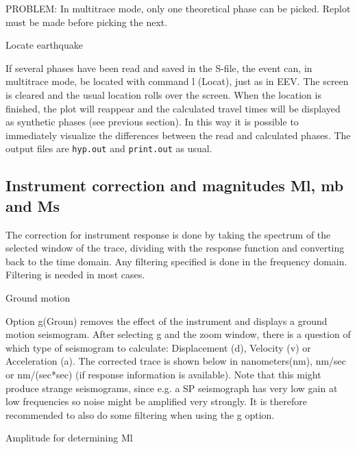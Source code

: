 PROBLEM: In multitrace mode, only one theoretical phase can be picked. Replot must be made before picking the next. 

Locate earthquake 

If several phases have been read and saved in the S-file, the event can, in multitrace mode, be located with command l (Locat), just as in EEV. The screen is cleared and the usual location rolls over the screen. When the location is finished, the plot will reappear and the calculated travel times will be displayed as synthetic phases (see previous section). In this way it is possible to immediately visualize the differences between the read and calculated phases. The output files are \texttt{hyp.out} and \texttt{print.out} as usual. 

\subsection{Instrument correction and magnitudes Ml, mb and Ms}

The correction for instrument response is done by taking the spectrum of the selected window of the trace, dividing with the response function and converting back to the time domain. Any filtering specified is done in the frequency domain. Filtering is needed in most cases. 

Ground motion 

Option g(Groun) removes the effect of the instrument and displays a ground motion seismogram. After selecting g and the zoom window, there is a question of which type of seismogram to calculate: Displacement (d), Velocity (v) or Acceleration (a). The corrected trace is shown below in nanometers(nm), nm/sec or nm/(sec*sec) (if response information is available). Note that this might produce strange seismograms, since e.g. a SP seismograph has very low gain at low frequencies so noise might be amplified very strongly. It is therefore recommended to also do some filtering when using the g option. 

Amplitude for determining Ml 

